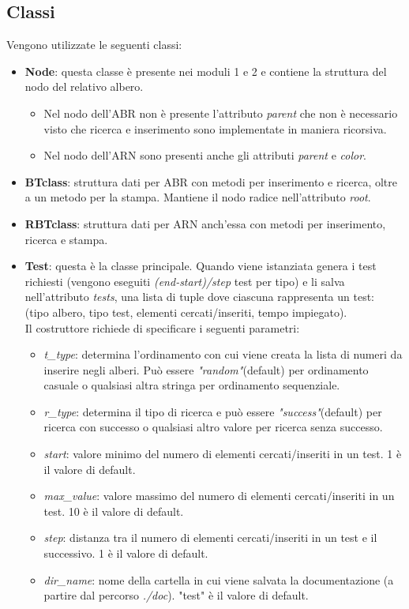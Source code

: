 \documentclass{article}
\begin{document}
\subsection{Classi}
Vengono utilizzate le seguenti classi:
\begin{itemize}
    \item \textbf{Node}: questa classe è presente nei moduli 1 e 2 e contiene la struttura del nodo del relativo albero.
    \begin{itemize}
        \item Nel nodo dell'ABR non è presente l'attributo \emph{parent} che non è necessario visto che ricerca e inserimento sono implementate in maniera ricorsiva. 
        \item Nel nodo dell'ARN sono presenti anche gli attributi \emph{parent} e \emph{color}.
    \end{itemize}
    \item \textbf{BTclass}: struttura dati per ABR con metodi per inserimento e ricerca, oltre a un metodo per la stampa. Mantiene il nodo radice nell'attributo \emph{root}.
    \item \textbf{RBTclass}: struttura dati per ARN anch'essa con metodi per inserimento, ricerca e stampa.
    \item \textbf{Test}: questa è la classe principale. Quando viene istanziata genera i test richiesti (vengono eseguiti \emph{(end-start)/step} test per tipo) e li salva nell'attributo \emph{tests}, una lista di tuple dove ciascuna rappresenta un test:\\(tipo albero, tipo test, elementi cercati/inseriti, tempo impiegato).\\Il costruttore richiede di specificare i seguenti parametri:
    \begin{itemize}
        \item \emph{t\_type}: determina l'ordinamento con cui viene creata la lista di numeri da inserire negli alberi. Può essere \emph{"random"}(default) per ordinamento casuale o qualsiasi altra stringa per ordinamento sequenziale.
        \item \emph{r\_type}: determina il tipo di ricerca e può essere \emph{"success"}(default) per ricerca con successo o qualsiasi altro valore per ricerca senza successo.
        \item \emph{start}: valore minimo del numero di elementi cercati/inseriti in un test. 1 è il valore di default.
        \item \emph{max\_value}: valore massimo del numero di elementi cercati/inseriti in un test. 10 è il valore di default.
        \item \emph{step}: distanza tra il numero di elementi cercati/inseriti in un test e il successivo. 1 è il valore di default.
        \item \emph{dir\_name}: nome della cartella in cui viene salvata la documentazione (a partire dal percorso \emph{./doc}). "test" è il valore di default.
    \end{itemize}
\end{itemize}
\end{document}
